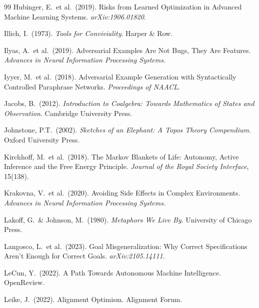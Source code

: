 \documentclass[12pt]{article}
\theoremstyle{definition}
\begin{document}
\begin{thebibliography}{99}
Hubinger, E.\ et al.\ (2019).
\newblock Risks from Learned Optimization in Advanced Machine Learning Systems.
\newblock \emph{arXiv:1906.01820}.

Illich, I.\ (1973).
\newblock \emph{Tools for Conviviality}.
\newblock Harper \& Row.

Ilyas, A.\ et al.\ (2019).
\newblock Adversarial Examples Are Not Bugs, They Are Features.
\newblock \emph{Advances in Neural Information Processing Systems}.

Iyyer, M.\ et al.\ (2018).
\newblock Adversarial Example Generation with Syntactically Controlled Paraphrase
Networks.
\newblock \emph{Proceedings of NAACL}.

Jacobs, B.\ (2012).
\newblock \emph{Introduction to Coalgebra: Towards Mathematics of States and
Observation}.
\newblock Cambridge University Press.

Johnstone, P.T.\ (2002).
\newblock \emph{Sketches of an Elephant: A Topos Theory Compendium}.
\newblock Oxford University Press.

Kirchhoff, M.\ et al.\ (2018).
\newblock The Markov Blankets of Life: Autonomy, Active Inference and the Free
Energy Principle.
\newblock \emph{Journal of the Royal Society Interface}, 15(138).

Krakovna, V.\ et al.\ (2020).
\newblock Avoiding Side Effects in Complex Environments.
\newblock \emph{Advances in Neural Information Processing Systems}.

Lakoff, G.\ \& Johnson, M.\ (1980).
\newblock \emph{Metaphors We Live By}.
\newblock University of Chicago Press.

Langosco, L.\ et al.\ (2023).
\newblock Goal Misgeneralization: Why Correct Specifications Aren't Enough for
Correct Goals.
\newblock \emph{arXiv:2105.14111}.

LeCun, Y.\ (2022).
\newblock A Path Towards Autonomous Machine Intelligence.
\newblock OpenReview.

Leike, J.\ (2022).
\newblock Alignment Optimism.
\newblock Alignment Forum.


\end{thebibliography}
\end{document}
